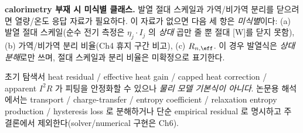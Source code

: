 \textbf{calorimetry 부재 시 미식별 클래스.} 발열 절대 스케일과 가역/비가역 분리를 닫으려면 열량/온도 응답 자료가
필요하다. 이 자료가 없으면 다음 세 항은 \emph{미식별}이다: (a) 발열 절대 스케일(순수 전기 측정은 $\eta_j\cdot I_j$
의 \emph{상대} 곱만 줄 뿐 절대 [W]를 닫지 못함), (b) 가역/비가역 분리 비율(Ch4 휴지 구간 비고), (c) $R_{n,\eff}$.
이 경우 발열식은 \emph{상대 분해}로만 쓰며, 절대 스케일과 분리 비율은 미확정으로 표기한다.
\begin{flagbox}
초기 탐색서 heat residual / effective heat gain / capped heat correction / apparent $I^2R$ 가 피팅을 안정화할
수 있으나 \emph{물리 모델 기본식이 아니다}. 논문용 해석에서는 transport / charge-transfer / entropy coefficient /
relaxation entropy production / hysteresis loss 로 분해하거나 단순 empirical residual 로 명시하고 주 결론에서
제외한다(solver/numerical 구현은 Ch6).
\end{flagbox}
